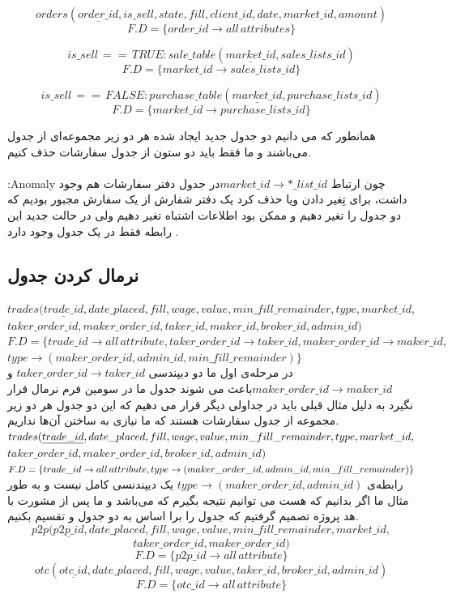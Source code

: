 \documentclass{book}
\begin{document}
$$orders(\underline{order\_id},is\_sell,state,fill,client\_id,date,market\_id,amount)$$
$$F.D = \{order\_id \rightarrow all\,attributes\}$$

$$is\_sell\,==\,TRUE:sale\_table(\underline{market\_id}, sales\_lists\_id)$$
$$F.D = \{market\_id \rightarrow sales\_lists\_id\}$$

$$is\_sell\,==\,FALSE:purchase\_table(\underline{market\_id}, purchase\_lists\_id)$$
$$F.D = \{market\_id \rightarrow purchase\_lists\_id\}$$

همانطور که می دانیم دو جدول جدید ایجاد شده هر دو زیر مجموعه‌ای از جدول  می‌باشند و ما فقط باید دو ستون از جدول سفارشات حذف کنیم.
\\ \\
\large{:Anomaly} چون ارتباط $market\_id \rightarrow *\_list\_id$در جدول دفتر سفارشات هم وجود داشت، برای تِغیر دادن ویا حذف کرد یک دفتر شفارش از یک سفارش مجبور بودیم که دو جدول را تغیر دهیم و ممکن بود اطلاعات اشتباه تغیر دهیم ولی در حالت جدید این رابطه فقط در یک جدول وجود دارد  .

\subsection{نرمال کردن جدول }
$ trades (\underline{trade\_id},date\_placed,fill,wage,value,min\_fill\_remainder,type,market\_id,$\\
$taker\_order\_id,maker\_order\_id,taker\_id,maker\_id,broker\_id,admin\_id)$\\
$F.D = \{trade\_id \rightarrow all\,attribute, taker\_order\_id \rightarrow taker\_id, maker\_order\_id \rightarrow maker\_id,$\\
$type \rightarrow (maker\_order\_id, admin\_id, min\_fill\_remainder)\}$
\\
در مرحله‌ی اول ما دو دیپندسی $taker\_order\_id \rightarrow taker\_id$ و $maker\_order\_id \rightarrow maker\_id$باعث می شوند جدول ما در سومین فرم نرمال قرار نگیرد به دلیل مثال قبلی باید در جداولی دیگر قرار می دهیم که این دو جدول هر دو زیر مجموعه از جدول سفارشات هستند که ما نیازی به ساختن آن‌ها نداریم.\\
$ trades (\underline{trade\_id},date\_placed,fill,wage,value,min\_fill\_remainder,\\type,market\_id,$\\
$taker\_order\_id,maker\_order\_id,broker\_id,admin\_id)$\\
$F.D = \{trade\_id \rightarrow all\,attribute, type \rightarrow (maker\_order\_id,\\ admin\_id, min\_fill\_remainder)\}$
\\
رابطه‌ی $type \rightarrow (maker\_order\_id, admin\_id)$ یک دیپندنسی کامل نیست و به طور مثال ما اگر بدانیم که  هست می توانیم نتیجه بگیرم که  می‌باشد و ما پس از مشورت با هد پروژه تصمیم گرفتیم که جدول را برا اساس  به دو جدول  و  تقسیم بکنیم.
$$ p2p (\underline{p2p\_id},date\_placed,fill,wage,value,min\_fill\_remainder,market\_id,$$
$$taker\_order\_id,maker\_order\_id)$$
$$F.D = \{p2p\_id \rightarrow all\,attribute\}$$
$$ otc (\underline{otc\_id},date\_placed,fill,wage,value,taker\_id, broker\_id,admin\_id)$$
$$F.D = \{otc\_id \rightarrow all\,attribute\}$$
\end{document}
